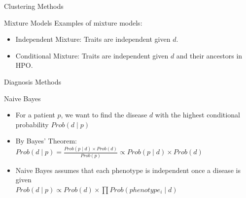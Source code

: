 \documentclass[final]{beamer} %
\begin{document}
\begin{frame}{}
\begin{columns}[T]
\begin{column}{0.3\linewidth}
\begin{block}{\Huge Clustering Methods}
\begin{block}{\Large Mixture Models}
			Examples of mixture models:
			\begin{itemize}
				\item Independent Mixture: Traits are independent given $d$.
				\item Conditional Mixture: Traits are independent given $d$ and their ancestors in HPO.
			\end{itemize}
		\end{block}
     \end{block}
     \vspace{3cm}

     \begin{block}{\Huge Diagnosis Methods}
   
     \begin{block}{\Large Naive Bayes}
     \begin{itemize}
        \Large
    \item
    For a patient $p$, we want to find the disease $d$ with the highest conditional probability $Prob(d \mid p )$
  \vspace{1cm}
  \item
   By Bayes' Theorem: \\
   $Prob(d \mid p) = \frac{Prob(p \mid d) \times Prob(d)}{Prob(p)} \propto Prob(p \mid d) \times Prob(d)$
  \vspace{1cm}
   \item
   Naive Bayes assumes that each phenotype is independent once a disease is given \\
   $Prob(d \mid p) \propto Prob(d) \times \prod Prob(phenotype_i \mid d)$
     \end{itemize}
   \end{block}
    \vspace{1cm}


\end{block}
\end{column}
\end{columns}
\end{frame}
\end{document}
